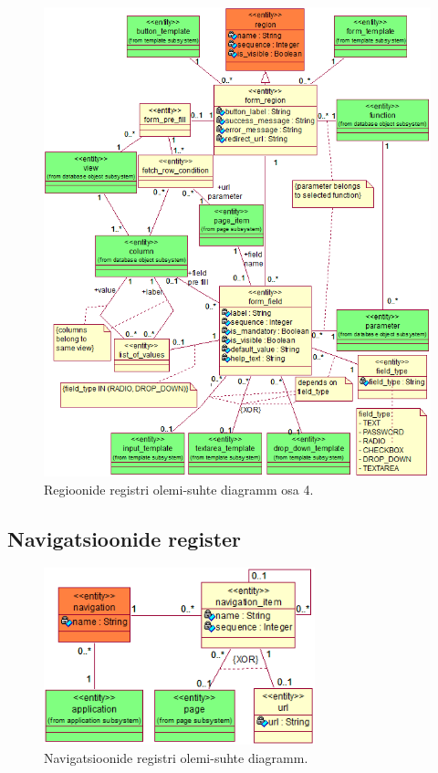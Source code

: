 \documentclass[a4paper,12pt]{article} %
\begin{document}
\begin{figure}[H]
\centering
\includegraphics[width=\textwidth]{./diagrams/form-region-er-diagram.png}
\caption{Regioonide registri olemi-suhte diagramm osa 4.}
\label{fig_vormide_regioonide_registri_olemi_suhte_diagramm}
\end{figure}

\pagebreak

\subsection*{Navigatsioonide register}
\begin{figure}[H]
\centering
\includegraphics[width=0.7\textwidth]{./diagrams/navigation-er-diagram.png}
\caption{Navigatsioonide registri olemi-suhte diagramm.}
\label{fig_navigatsioonide_registri_olemi_suhte_diagramm}
\end{figure}
\end{document}
